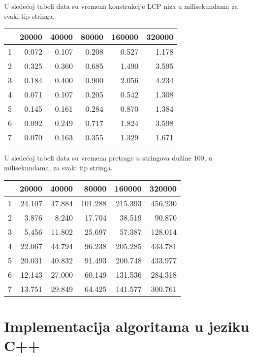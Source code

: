 U slede\' coj tabeli data su vremena konstrukcije LCP niza u milisekundama za svaki tip stringa.

\begin{tabular}{r|r|r|r|r|r}
                & 20000 & 40000 & 80000 & 160000 & 320000 \\
\hline
1 & 0.072 & 0.107 & 0.208 & 0.527 & 1.178  \\
\hline
2 & 0.325 & 0.360 & 0.685 & 1.490 & 3.595  \\
\hline
3 & 0.184 & 0.400 & 0.900 & 2.056 & 4.234  \\
\hline
4 & 0.071 & 0.107 & 0.205 & 0.542 & 1.308  \\
\hline
5 & 0.145 & 0.161 & 0.284 & 0.870 & 1.384  \\
\hline
6 & 0.092 & 0.249 & 0.717 & 1.824 & 3.598  \\
\hline
7 & 0.070 & 0.163 & 0.355 & 1.329 & 1.671  \\

\end{tabular}

U slede\' coj tabeli data su vremena pretrage $n$ stringova du\v zine $100$, u milisekundama, za svaki tip stringa.

\begin{tabular}{r|r|r|r|r|r}
                & 20000 & 40000 & 80000 & 160000 & 320000 \\
\hline
1 & 24.107 & 47.884 & 101.288 & 215.393 & 456.230  \\
\hline
2 & 3.876 & 8.240 & 17.704 & 38.519 & 90.870  \\
\hline
3 & 5.456 & 11.802 & 25.697 & 57.387 & 128.014  \\
\hline
4 & 22.067 & 44.794 & 96.238 & 205.285 & 433.781  \\
\hline
5 & 20.031 & 40.832 & 91.493 & 200.748 & 433.977  \\
\hline
6 & 12.143 & 27.000 & 60.149 & 131.536 & 284.318  \\
\hline
7 & 13.751 & 29.849 & 64.425 & 141.577 & 300.761  \\
\end{tabular}

\newpage
\section{Implementacija algoritama u jeziku C++}
\label{sirkod}
